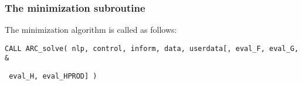 \documentclass{galahad}
\newcommand{\packagename}{ARC}
\begin{document}

\subsubsection{The minimization subroutine}
The minimization algorithm is called as follows:
\vspace*{1mm}

\hspace{8mm}
{\tt CALL \packagename\_solve( nlp, control, inform, data, userdata[, eval\_F,
eval\_G, \hspace{8mm}                  \&}
\vspace*{-1mm}

\hspace{37mm}
{\tt
eval\_H,  eval\_HPROD] )}
\end{document}
